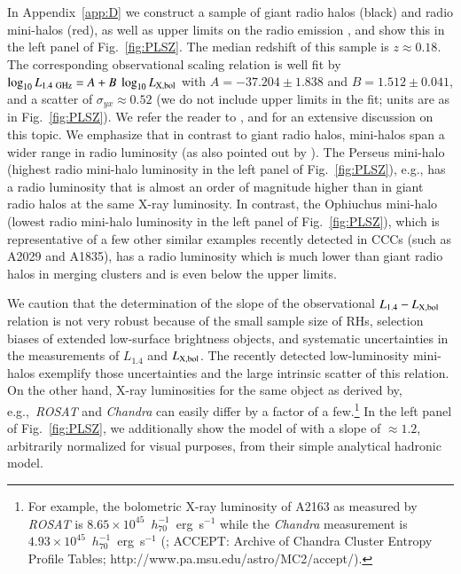 \documentclass[useAMS,usenatbib]{mn2e}
\begin{document}
In Appendix~\ref{app:D} we construct a sample of giant radio halos (black) and
radio mini-halos (red), as well as upper limits on the radio emission
\citep{2009A&A...499..371G,2009A&A...507..661B, 2011A&A...527A..99E}, and show
this in the left panel of Fig.~\ref{fig:PLSZ}. The median redshift of this
sample is $z\approx0.18$. The corresponding observational scaling relation is
well fit by $\log_{10} L_{1.4~{\mathrm{GHz}}} = A + B~\log_{10} L_{{\mathrm{X,bol}}}$ with
$A=-37.204\pm1.838$ and $B=1.512\pm0.041$, and a scatter of $\sigma_{yx} \approx
0.52$ (we do not include upper limits in the fit; units are as in
Fig.~\ref{fig:PLSZ}). We refer the reader to \cite{2009A&A...507..661B}, 
\cite{2011A&A...527A..99E} and \cite{2013arXiv1306.4379C} for an extensive discussion on this topic. 
We emphasize that in contrast to giant radio halos, mini-halos span a wider range
in radio luminosity (as also pointed out by \citealp{2009A&A...499..679M}). The
Perseus mini-halo (highest radio mini-halo luminosity in the left panel of
Fig.~\ref{fig:PLSZ}), e.g., has a radio luminosity that is almost an order of
magnitude higher than in giant radio halos at the same X-ray luminosity. In
contrast, the Ophiuchus mini-halo (lowest radio mini-halo luminosity in the left
panel of Fig.~\ref{fig:PLSZ}), which is representative of a few other similar
examples recently detected in CCCs (such as A2029 and A1835), has a radio
luminosity which is much lower than giant radio halos in merging clusters and is
even below the upper limits.

We caution that the determination of the slope of the observational
$L_{1.4}-L_{{\mathrm{X,bol}}}$ relation is not very robust because of the small
sample size of RHs, selection biases of extended low-surface brightness objects,
and systematic uncertainties in the measurements of $L_{1.4}$ and
$L_{{\mathrm{X,bol}}}$. The recently detected low-luminosity mini-halos exemplify
those uncertainties and the large intrinsic scatter of this relation. On the
other hand, X-ray luminosities for the same object as derived by,
e.g.,~\emph{ROSAT} and \emph{Chandra} can easily differ by a factor of a
few.\footnote{For example, the bolometric X-ray luminosity of A2163 as measured
  by \emph{ROSAT} is $8.65\times10^{45}$~$h_{70}^{-1}$~erg~s$^{-1}$
  \citep{2009A&A...507..661B} while the \emph{Chandra} measurement is
  $4.93\times10^{45}$~$h_{70}^{-1}$~erg~s$^{-1}$ (\citealp{2009ApJS..182...12C};
  ACCEPT: Archive of Chandra Cluster Entropy Profile Tables;
  http://www.pa.msu.edu/astro/MC2/accept/).}  In the left panel of
Fig.~\ref{fig:PLSZ}, we additionally show the model of
\citet{2009JCAP...09..024K} with a slope of $\approx1.2$, arbitrarily normalized
for visual purposes, from their simple analytical hadronic model.
\end{document}
